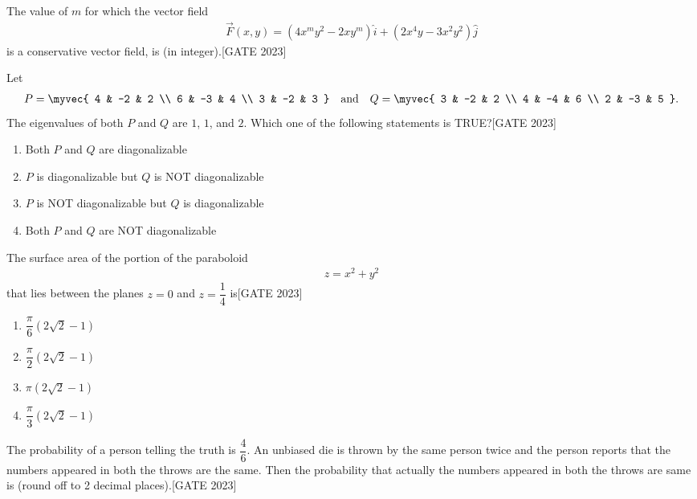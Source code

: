     \item The value of $m$ for which the vector field
    \begin{align*}
    \vec{F}(x, y) = (4x^m y^2 - 2 x y^m) \hat{i} + (2x^4 y - 3x^2 y^2) \hat{j}
    \end{align*}
  is a conservative vector field, is \underline{\hspace{1cm}} (in integer).\hfill{[GATE 2023]}
\item Let
    \begin{align*}
    P = \myvec{ 4 & -2 & 2 \\ 6 & -3 & 4 \\ 3 & -2 & 3 } \quad \text{and} \quad Q = \myvec{ 3 & -2 & 2 \\ 4 & -4 & 6 \\ 2 & -3 & 5 }.
    \end{align*}
    The eigenvalues of both $P$ and $Q$ are $1$, $1$, and $2$. Which one of the following statements is TRUE?\hfill{[GATE 2023]}
   
    \begin{enumerate}
        \item Both $P$ and $Q$ are diagonalizable
        \item $P$ is diagonalizable but $Q$ is NOT diagonalizable
        \item $P$ is NOT diagonalizable but $Q$ is diagonalizable
        \item Both $P$ and $Q$ are NOT diagonalizable
    \end{enumerate}
   

    \item The surface area of the portion of the paraboloid
    \begin{align*}
    z = x^2 + y^2
    \end{align*}
    that lies between the planes $z = 0$ and $z = \dfrac{1}{4}$ is\hfill{[GATE 2023]}
    \begin{multicols}{4}
    \begin{enumerate}
        \item $\dfrac{\pi}{6} (2\sqrt{2} - 1)$
        \item $\dfrac{\pi}{2} (2\sqrt{2} - 1)$
        \item $\pi (2\sqrt{2} - 1)$
        \item $\dfrac{\pi}{3} (2\sqrt{2} - 1)$
    \end{enumerate}
    \end{multicols}

    \item The probability of a person telling the truth is $\dfrac{4}{6}$. An unbiased die is thrown by the same person twice and the person reports that the numbers appeared in both the throws are the same. Then the probability that actually the numbers appeared in both the throws are same is \underline{\hspace{1cm}} (round off to 2 decimal places).\hfill{[GATE 2023]}

